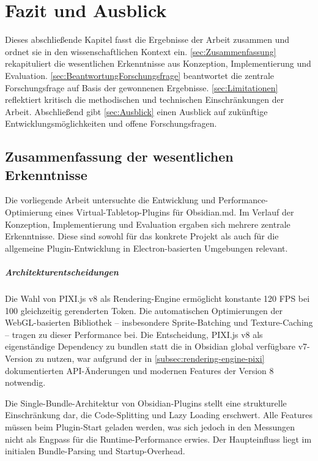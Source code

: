 \chapter{Fazit und Ausblick}
\label{sec:FazitAusblick}
\label{sec:fazit}

Dieses abschließende Kapitel fasst die Ergebnisse der Arbeit zusammen und ordnet sie in den wissenschaftlichen Kontext ein. \autoref{sec:Zusammenfassung} rekapituliert die wesentlichen Erkenntnisse aus Konzeption, Implementierung und Evaluation. \autoref{sec:BeantwortungForschungsfrage} beantwortet die zentrale Forschungsfrage auf Basis der gewonnenen Ergebnisse. \autoref{sec:Limitationen} reflektiert kritisch die methodischen und technischen Einschränkungen der Arbeit. Abschließend gibt \autoref{sec:Ausblick} einen Ausblick auf zukünftige Entwicklungsmöglichkeiten und offene Forschungsfragen.

\section{Zusammenfassung der wesentlichen Erkenntnisse}
\label{sec:Zusammenfassung}

Die vorliegende Arbeit untersuchte die Entwicklung und Performance-Optimierung eines Virtual-Tabletop-Plugins für Obsidian.md. Im Verlauf der Konzeption, Implementierung und Evaluation ergaben sich mehrere zentrale Erkenntnisse. Diese sind sowohl für das konkrete Projekt als auch für die allgemeine Plugin-Entwicklung in Electron-basierten Umgebungen relevant.

\paragraph{Architekturentscheidungen}
Die Wahl von PIXI.js v8 als Rendering-Engine ermöglicht konstante 120 \ac{FPS} bei 100 gleichzeitig gerenderten Token. Die automatischen Optimierungen der \ac{WebGL}-basierten Bibliothek -- insbesondere Sprite-Batching und Texture-Caching -- tragen zu dieser Performance bei. Die Entscheidung, PIXI.js v8 als eigenständige Dependency zu bundlen statt die in Obsidian global verfügbare v7-Version zu nutzen, war aufgrund der in \autoref{subsec:rendering-engine-pixi} dokumentierten \ac{API}-Änderungen und modernen Features der Version 8 notwendig.

Die Single-Bundle-Architektur von Obsidian-Plugins stellt eine strukturelle Einschränkung dar, die Code-Splitting und Lazy Loading erschwert. Alle Features müssen beim Plugin-Start geladen werden, was sich jedoch in den Messungen nicht als Engpass für die Runtime-Performance erwies. Der Haupteinfluss liegt im initialen Bundle-Parsing und Startup-Overhead.


